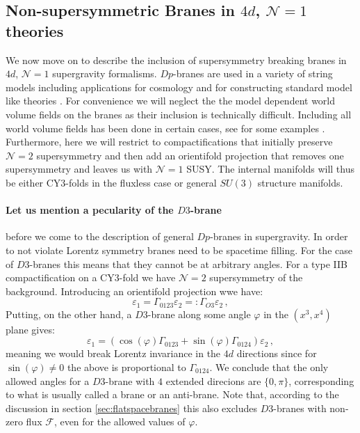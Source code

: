 \documentclass[12pt]{report}
\newcommand{\be}{\begin{equation}}
\newcommand{\ee}{\end{equation}}
\begin{document}
\subsection{Non-supersymmetric Branes in $4d$, $\mathcal{N}=1$ theories}
We now move on to describe the inclusion of supersymmetry breaking branes in $4d$, $\mathcal{N}=1$ supergravity formalisms. $Dp$-branes are used in a variety of string models including applications for cosmology \cite{Grana:2005jc,Douglas:2006es} and for constructing standard model like theories \cite{Blumenhagen:2006ci,Blumenhagen:2005mu}. For convenience we will neglect the the model dependent world volume fields on the branes as their inclusion is technically difficult. Including all world volume fields has been done in certain cases, see for some examples \cite{Vercnocke:2016fbt,Kallosh:2016aep,Kachru:2003aw,Aalsma:2017ulu,GarciadelMoral:2017vnz,Cribiori:2019hod}. Furthermore, here we will restrict to compactifications that initially preserve $\mathcal{N}=2$ supersymmetry and then add an orientifold projection that removes one supersymmetry and leaves us with $\mathcal{N}=1$ SUSY. The internal manifolds will thus be either CY3-folds in the fluxless case or general $SU(3)$ structure manifolds. 
\paragraph{Let us mention a pecularity of the $D3$-brane} before we come to the description of general $Dp$-branes in supergravity. In order to not violate Lorentz symmetry branes need to be spacetime filling. For the case of $D3$-branes this means that they cannot be at arbitrary angles. For a type IIB compactification on a CY3-fold we have $\mathcal{N}=2$ supersymmetry of the background. Introducing an orientifold projection wwe have:
\be
\varepsilon_1 = \Gamma_{0123}\varepsilon_2 =: \Gamma_{O3} \varepsilon_2\,,
\ee
Putting, on the other hand, a $D3$-brane along some angle $\varphi$ in the $(x^3,x^4)$ plane gives:
\be 
\varepsilon_1 = \left( \cos (\varphi) \Gamma_{0123} + \sin (\varphi) \Gamma_{0124} \right) \varepsilon_2\,,
\ee
meaning we would break Lorentz invariance in the $4d$ directions since for $\sin (\varphi)\neq0$ the above is proportional to $\Gamma_{0124}$. We conclude that the only allowed angles for a $D3$-brane with $4$ extended direcions are $\{0,\pi\}$, corresponding to what is usually called a brane or an anti-brane. Note that, according to the discussion in section \ref{sec:flatspacebranes} this also excludes $D3$-branes with non-zero flux $\mathcal{F}$, even for the allowed values of $\varphi$.
\end{document}
